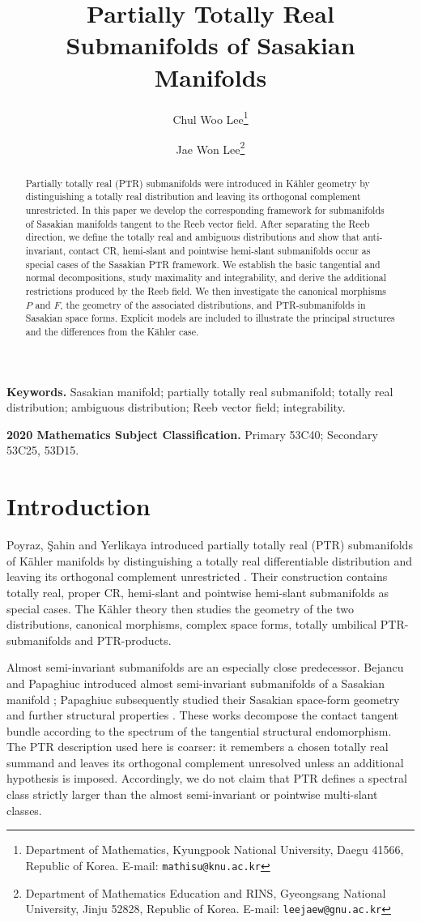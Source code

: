 \documentclass[11pt]{article}
\title{Partially Totally Real Submanifolds of Sasakian Manifolds}
\author{%
Chul Woo Lee\thanks{Department of Mathematics, Kyungpook National University,
Daegu 41566, Republic of Korea. E-mail: \texttt{mathisu@knu.ac.kr}}
\and
Jae Won Lee\thanks{Department of Mathematics Education and RINS,
Gyeongsang National University, Jinju 52828, Republic of Korea.
E-mail: \texttt{leejaew@gnu.ac.kr}}}
\date{}
\theoremstyle{definition}\newtheorem{definition}[theorem]{Definition}\newtheorem{example}[theorem]{Example}
\theoremstyle{remark}\newtheorem{remark}[theorem]{Remark}
\begin{document}
\maketitle
\begin{abstract}
Partially totally real (PTR) submanifolds were introduced in K\"ahler
geometry by distinguishing a totally real distribution and leaving its
orthogonal complement unrestricted.  In this paper we develop the
corresponding framework for submanifolds of Sasakian manifolds tangent to
the Reeb vector field.  After separating the Reeb direction, we define the
totally real and ambiguous distributions and show that anti-invariant,
contact CR, hemi-slant and pointwise hemi-slant submanifolds occur as
special cases of the Sasakian PTR framework.  We establish the basic
tangential and normal decompositions, study maximality and integrability,
and derive the additional restrictions produced by the Reeb field.  We
then investigate the canonical morphisms \(P\) and \(F\), the geometry of
the associated distributions, and PTR-submanifolds in Sasakian space
forms.  Explicit models are included to illustrate the principal
structures and the differences from the K\"ahler case.
\end{abstract}
\noindent\textbf{Keywords.} Sasakian manifold; partially totally real submanifold; totally real distribution; ambiguous distribution; Reeb vector field; integrability.

\medskip
\noindent\textbf{2020 Mathematics Subject Classification.}
Primary 53C40; Secondary 53C25, 53D15.

\section{Introduction}
Poyraz, \c{S}ahin and Yerlikaya introduced partially totally real (PTR)
submanifolds of K\"ahler manifolds by distinguishing a totally real
differentiable distribution and leaving its orthogonal complement
unrestricted \cite{PoyrazSahinYerlikaya2025}.  Their construction contains
totally real, proper CR, hemi-slant and pointwise hemi-slant submanifolds
as special cases.  The K\"ahler theory then studies the geometry of the two
distributions, canonical morphisms, complex space forms, totally umbilical
PTR-submanifolds and PTR-products.

Almost semi-invariant submanifolds are an especially close predecessor.
Bejancu and Papaghiuc introduced almost semi-invariant submanifolds of a
Sasakian manifold \cite{BejancuPapaghiuc1984ASI}; Papaghiuc subsequently
studied their Sasakian space-form geometry and further structural
properties \cite{Papaghiuc1983SpaceForms,Papaghiuc1984Results}.  These
works decompose the contact tangent bundle according to the spectrum of
the tangential structural endomorphism.  The PTR description used here is
coarser: it remembers a chosen totally real summand and leaves its
orthogonal complement unresolved unless an additional hypothesis is
imposed.  Accordingly, we do not claim that PTR defines a spectral class
strictly larger than the almost semi-invariant or pointwise multi-slant
classes.
\end{document}
